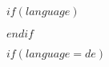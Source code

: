 


$if(language)$ %
  \usepackage{polyglossia}
  \setmainlanguage{$language$}
$endif$

$if(language=de)$
\usepackage[german]{datetime2}
\addto\captionsgerman{%
  \renewcommand{\contentsname}{Inhaltsverzeichnis}  
}